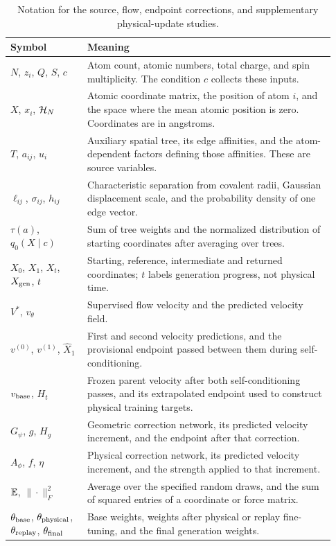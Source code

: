 \begin{table}[htbp]
\centering
\caption{Notation for the source, flow, endpoint corrections, and supplementary physical-update studies.}
\small
\begin{tabular}{p{0.22\linewidth}p{0.71\linewidth}}
\toprule
Symbol & Meaning\\
\midrule
$N$, $z_i$, $Q$, $S$, $c$ & Atom count, atomic numbers, total charge, and spin multiplicity. The condition $c$ collects these inputs.\\
$X$, $x_i$, $\mathcal H_N$ & Atomic coordinate matrix, the position of atom $i$, and
the space where the mean atomic position is zero. Coordinates are in angstroms.\\
$T$, $a_{ij}$, $u_i$ & Auxiliary spatial tree, its edge affinities, and the
atom-dependent factors defining those affinities. These are source variables.\\
$\ell_{ij}$, $\sigma_{ij}$, $h_{ij}$ & Characteristic separation from covalent
radii, Gaussian displacement scale, and the probability density of one edge vector.\\
$\tau(a)$, $q_0(X\mid c)$ & Sum of tree weights and the normalized distribution
of starting coordinates after averaging over trees.\\
$X_0$, $X_1$, $X_t$, $X_{\rm gen}$, $t$ & Starting, reference, intermediate and
returned coordinates; $t$ labels generation progress, not physical time.\\
$V^*$, $v_\theta$ & Supervised flow velocity and the predicted velocity field.\\
$v^{(0)}$, $v^{(1)}$, $\widehat X_1$ & First and second velocity predictions,
and the provisional endpoint passed between them during self-conditioning.\\
$v_{\rm base}$, $H_t$ & Frozen parent velocity after both self-conditioning passes,
and its extrapolated endpoint used to construct physical training targets.\\
$G_\psi$, $g$, $H_g$ & Geometric correction network, its predicted velocity increment,
and the endpoint after that correction.\\
$A_\phi$, $f$, $\eta$ & Physical correction network, its predicted velocity increment,
and the strength applied to that increment.\\
$\mathbb E$, $\|\cdot\|_F^2$ & Average over the specified random draws, and the sum
of squared entries of a coordinate or force matrix.\\
$\theta_{\rm base}$, $\theta_{\rm physical}$,
$\theta_{\rm replay}$, $\theta_{\rm final}$ & Base weights, weights after physical or replay fine-tuning, and the final generation weights.\\

\end{tabular}
\end{table}
